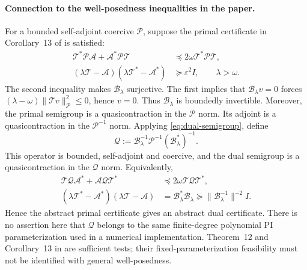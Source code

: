 \documentclass[11pt,a4paper]{article}
\newcommand{\OpT}{\mathcal T}
\newcommand{\OpA}{\mathcal A}
\newcommand{\OpB}{\mathcal B_\lambda}
\newcommand{\OpP}{\mathcal P}
\newcommand{\OpQ}{\mathcal Q}
\begin{document}
\paragraph{Connection to the well-posedness inequalities in the paper.}
For a bounded self-adjoint coercive $\OpP$, suppose the primal certificate
in Corollary~13 of \cite{jagt} is satisfied:
\begin{align}
 \OpT^*\OpP\OpA+\OpA^*\OpP\OpT
 &\preceq2\omega\OpT^*\OpP\OpT,\label{eq:primal-dissipativity}\\
 (\lambda\OpT-\OpA)(\lambda\OpT^*-\OpA^*)
 &\succeq\varepsilon^2 I,\qquad\lambda>\omega.
 \label{eq:primal-surjectivity}
\end{align}
The second inequality makes $\OpB$ surjective. The first implies that
$\OpB v=0$ forces
$(\lambda-\omega)\|\OpT v\|_{\OpP}^2\leq0$, hence $v=0$.
Thus $\OpB$ is boundedly invertible. Moreover, the primal semigroup is
a quasicontraction in the $\OpP$ norm. Its adjoint is a quasicontraction
in the $\OpP^{-1}$ norm. Applying \eqref{eq:dual-semigroup}, define
\begin{equation}\label{eq:dual-storage}
 \OpQ:=\OpB^{-1}\OpP^{-1}(\OpB^*)^{-1}.
\end{equation}
This operator is bounded, self-adjoint and coercive, and the dual
semigroup is a quasicontraction in the $\OpQ$ norm. Equivalently,
\begin{align*}
 \OpT\OpQ\OpA^*+\OpA\OpQ\OpT^*
 &\preceq2\omega\OpT\OpQ\OpT^*,\\
 (\lambda\OpT^*-\OpA^*)(\lambda\OpT-\OpA)
 &=\OpB^*\OpB\succeq\|\OpB^{-1}\|^{-2}I.
\end{align*}
Hence the abstract primal certificate gives an abstract dual certificate.
There is no assertion here that $\OpQ$ belongs to the same finite-degree
polynomial PI parameterization used in a numerical implementation.
Theorem~12 and Corollary~13 in \cite{jagt} are sufficient tests; their
fixed-parameterization feasibility must not be identified with general
well-posedness.
\end{document}
